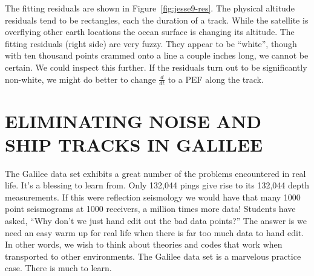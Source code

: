 \par
The fitting residuals
are shown in Figure~\ref{fig:jesse9-res}.
The physical altitude residuals tend to be rectangles,
each the duration of a track.
While the satellite is overflying other earth locations the ocean surface
is changing its altitude.
The fitting residuals (right side) are very fuzzy.
They appear to be ``white'', though with ten thousand points
crammed onto a line a couple inches long, we cannot be certain.
We could inspect this further.
If the residuals turn out to be significantly non-white,
we might do better to change $\frac{d}{ dt}$ to a PEF along the track.
















\section{ELIMINATING NOISE AND SHIP TRACKS IN GALILEE}

\par
The Galilee data set exhibits a great number of the problems
encountered in real life.   It's a blessing to learn from.
Only 132,044 pings give rise to its 132,044 depth measurements.
If this were reflection seismology
we would have that many 1000 point seismograms
at 1000 receivers, a million times more data!
Students have asked,
``Why don't we just hand edit out the bad data points?''
The answer is we need an easy warm up
for real life when there is far too much data to hand edit.
In other words, we wish to think about theories and codes
that work when transported to other environments.
The Galilee data set is a marvelous practice case.
There is much to learn.

